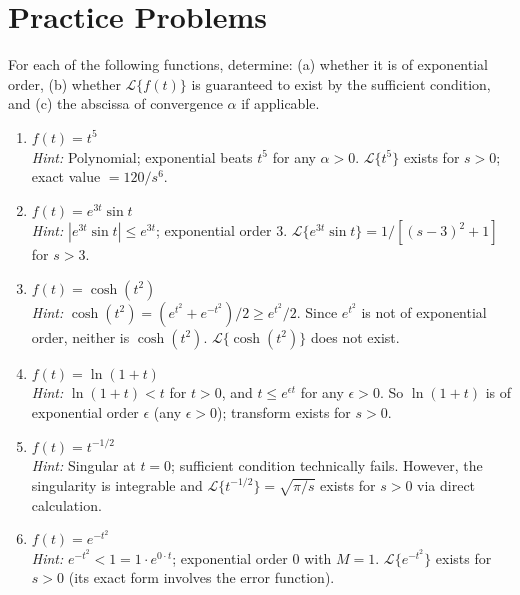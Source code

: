 \documentclass[12pt,a4paper]{article}
\begin{document}
\section{Practice Problems}

For each of the following functions, determine: (a) whether it is of exponential order,
(b) whether $\mathcal{L}\{f(t)\}$ is guaranteed to exist by the sufficient condition,
and (c) the abscissa of convergence $\alpha$ if applicable.

\begin{enumerate}[label=\textbf{P\arabic*.}]

\item $f(t) = t^5$ \\
\textit{Hint:} Polynomial; exponential beats $t^5$ for any $\alpha > 0$. $\mathcal{L}\{t^5\}$
exists for $s > 0$; exact value $= 120/s^6$.

\item $f(t) = e^{3t} \sin t$ \\
\textit{Hint:} $|e^{3t}\sin t| \leq e^{3t}$; exponential order $3$.
$\mathcal{L}\{e^{3t}\sin t\} = 1/[(s-3)^2+1]$ for $s > 3$.

\item $f(t) = \cosh(t^2)$ \\
\textit{Hint:} $\cosh(t^2) = (e^{t^2} + e^{-t^2})/2 \geq e^{t^2}/2$.
Since $e^{t^2}$ is not of exponential order, neither is $\cosh(t^2)$.
$\mathcal{L}\{\cosh(t^2)\}$ does not exist.

\item $f(t) = \ln(1 + t)$ \\
\textit{Hint:} $\ln(1+t) < t$ for $t > 0$, and $t \leq e^{\epsilon t}$ for any $\epsilon > 0$.
So $\ln(1+t)$ is of exponential order $\epsilon$ (any $\epsilon > 0$); transform exists
for $s > 0$.

\item $f(t) = t^{-1/2}$ \\
\textit{Hint:} Singular at $t = 0$; sufficient condition technically fails.
However, the singularity is integrable and $\mathcal{L}\{t^{-1/2}\} = \sqrt{\pi/s}$ exists for
$s > 0$ via direct calculation.

\item $f(t) = e^{-t^2}$ \\
\textit{Hint:} $e^{-t^2} < 1 = 1 \cdot e^{0 \cdot t}$; exponential order $0$ with $M=1$.
$\mathcal{L}\{e^{-t^2}\}$ exists for $s > 0$ (its exact form involves the error function).

\end{enumerate}
\end{document}
